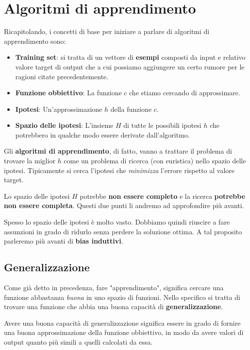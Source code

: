 \section{Algoritmi di apprendimento}
Ricapitolando, i concetti di base per iniziare a parlare di algoritmi di apprendimento sono:
\begin{itemize}
	\item \textbf{Training set}: si tratta di un vettore di \textbf{esempi} composti da input e relativo valore target di
	      output che a cui possiamo aggiungere un certo rumore per le ragioni citate precedentemente.
	\item \textbf{Funzione obbiettivo}: La funzione $c$ che stiamo cercando di approssimare.
	\item \textbf{Ipotesi}: Un'approssimazione $h$ della funzione $c$.
	\item \textbf{Spazio delle ipotesi}: L'insieme $H$ di tutte le possibili ipotesi $h$ che potrebbero in qualche modo
	      essere derivate dall'algoritmo.
\end{itemize}

Gli \textbf{algoritmi di apprendimento}, di fatto, vanno a trattare il problema di trovare la miglior $h$ come un problema
di ricerca (con euristica) nello spazio delle ipotesi. Tipicamente si cerca l'ipotesi che \emph{minimizza} l'errore
rispetto al valore target.

Lo spazio delle ipotesi $H$ potrebbe \textbf{non essere completo} e la ricerca \textbf{potrebbe non essere completa}. Questi
due punti li andremo ad approfondire pi\`u avanti.

Spesso lo spazio delle ipotesi \`e molto vasto. Dobbiamo quindi riuscire a fare assunzioni in grado di ridurlo senza perdere
la soluzione ottima. A tal proposito parleremo pi\`u avanti di \textbf{bias induttivi}.

\subsection{Generalizzazione}
Come gi\`a detto in precedenza, fare "apprendimento", significa cercare una funzione abbastanza \emph{buona} in uno spazio
di funzioni. Nello specifico si tratta di trovare una funzione che abbia una buona capacit\`a di \textbf{generalizzazione}.

Avere una buona capacit\`a di generalizzazione significa essere in grado di fornire una buona approssimazione della funzione
obbiettivo, in modo da avere valori di output quanto pi\`u simili a quelli calcolati da essa.

